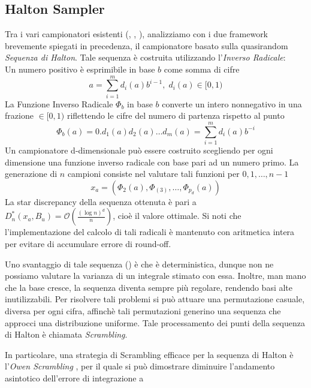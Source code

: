 \subsection{Halton Sampler}
Tra i vari campionatori esistenti (\cite{pharr}, \cite{pegoraro}, \cite{akenine-moller}), analizziamo con i due framework brevemente spiegati in 
precedenza, il campionatore basato sulla quasirandom \textit{Sequenza di Halton}. Tale sequenza \`e costruita utilizzando 
l'\textit{Inverso Radicale}:\\
Un numero positivo \`e esprimibile in base $b$ come somma di cifre 
\begin{equation}
	a=\sum_{i=1}^{m}d_i(a)b^{i-1},\;d_i(a)\in[0,1)
\end{equation}
La Funzione Inverso Radicale $\Phi_b$ in base $b$ converte un intero nonnegativo in una frazione $\in[0,1)$ riflettendo le cifre del numero di 
partenza rispetto al punto
\begin{equation}
	\Phi_b(a)=0.d_1(a)d_2(a)\ldots d_m(a)=\sum_{i=1}^md_i(a)b^{-i}
\end{equation}
Un campionatore d-dimensionale pu\`o essere costruito scegliendo per ogni dimensione una funzione inverso radicale con base pari ad un numero primo. 
La generazione di $n$ campioni consiste nel valutare tali funzioni per $0,1,\ldots,n-1$
\begin{equation}
	x_a=(\Phi_2(a),\Phi_(3),\ldots,\Phi_{p_d}(a))
\end{equation}
La star discrepancy della sequenza ottenuta \`e pari a \mbox{$D_n^*(x_a,B_u)=\mathcal{O}\left(\frac{(\log n)^d}{n}\right)$}, cio\`e il valore ottimale.
Si noti che l'implementazione del calcolo di tali radicali \`e mantenuto con aritmetica intera per evitare di accumulare errore di round-off.\par
Uno svantaggio di tale sequenza (\cite{pharr}) \`e che \`e deterministica, dunque non ne possiamo valutare la varianza di un integrale stimato con 
essa. Inoltre, man mano che la base cresce, la sequenza diventa sempre pi\`u regolare, rendendo basi alte inutilizzabili. Per risolvere tali problemi
si pu\`o attuare una permutazione casuale, diversa per ogni cifra, affinch\`e tali permutazioni generino una sequenza che approcci una distribuzione 
uniforme. Tale processamento dei punti della sequenza di Halton \`e chiamata \textit{Scrambling}.\par
In particolare, una strategia di Scrambling efficace per la sequenza di Halton \`e l'\textit{Owen Scrambling} \cite{pharr}, per il quale si pu\`o
dimostrare diminuire l'andamento asintotico dell'errore di integrazione a
